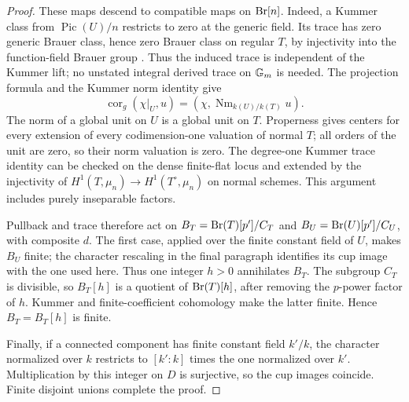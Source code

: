 \begin{proof}
These maps descend to compatible maps on \(\operatorname{Br}[n]\).
Indeed, a Kummer class from \(\operatorname{Pic}(U)/n\)
restricts to zero at the generic field.  Its trace has zero
generic Brauer class, hence zero Brauer class on regular \(T\),
by injectivity into the function-field Brauer group
\cite[Proposition~1.4 and Corollary~1.8]{BGrothendieckBrauerII1966}.
Thus the induced trace is independent of the Kummer lift; no
unstated integral derived trace on \({\mathbb G_m}\) is needed.
The projection formula and the Kummer norm identity give
\[
 \operatorname{cor}_g(\chi|_U,u)
             =(\chi,\operatorname{Nm}_{k(U)/k(T)}u).
\]
The norm of a global unit on \(U\) is a global unit on \(T\).
Properness gives centers for every extension of every
codimension-one valuation of normal \(T\); all orders of the
unit are zero, so their norm valuation is zero.  The degree-one
Kummer trace identity can be checked on the dense finite-flat
locus and extended by the injectivity of
\(H^1(T,\mu_n)\to H^1(T^\circ,\mu_n)\) on normal schemes.
This argument includes purely inseparable factors.

Pullback and trace therefore act on
\(B_T=\operatorname{Br}(T)[p']/C_T\) and \(B_U=\operatorname{Br}(U)[p']/C_U\),
with composite \(d\).  The first case, applied over the finite
constant field of \(U\), makes \(B_U\) finite; the character
rescaling in the final paragraph identifies its cup image with
the one used here.  Thus one
integer \(h>0\) annihilates \(B_T\).  The subgroup \(C_T\)
is divisible, so \(B_T[h]\) is a quotient of
\(\operatorname{Br}(T)[h]\), after removing the \(p\)-power factor of
\(h\).  Kummer and finite-coefficient cohomology make the latter
finite.  Hence \(B_T=B_T[h]\) is finite.

Finally, if a connected component has finite constant field
\(k'/k\), the character normalized over \(k\) restricts to
\([k':k]\) times the one normalized over \(k'\).
Multiplication by this integer on \(D\) is surjective, so
the cup images coincide.  Finite disjoint unions complete the
proof.
\end{proof}

